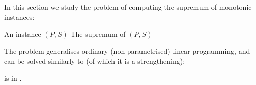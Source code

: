 In this section we study the problem of computing the supremum of monotonic instances:

\compprobext{\allpolyineqmaxname} %
{An instance $(P, S)$}
{The supremum of $(P, S)$}

\noindent
The problem generalises ordinary (non-parametrised) linear programming, and can be solved
similarly to \allpolyineqsolvname (of which it is a strengthening):
%
\begin{theorem} \label{thm:lp-max-poly}
\allpolyineqmaxname is in \PTIME.
\end{theorem}
%
